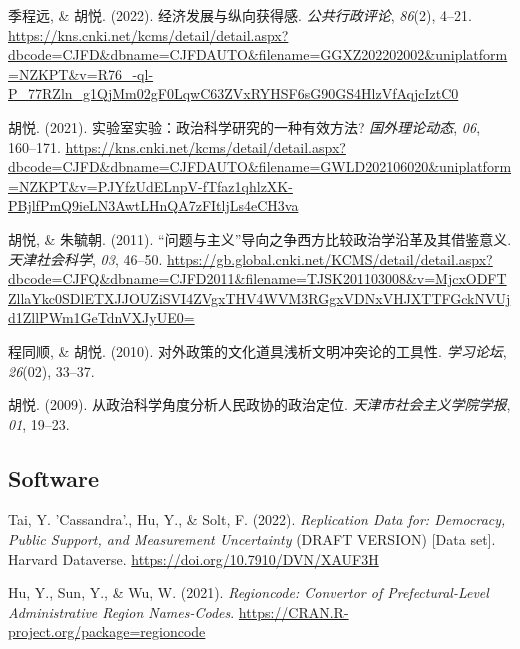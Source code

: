 \documentclass[11pt,a4paper,]{awesome-cv}
\begin{document}
\begingroup
\setlength{\parindent}{-0.5in}
\setlength{\leftskip}{0.5in}

\hypertarget{bibliography}{}
\leavevmode{}%
季程远, \& 胡悦. (2022). 经济发展与纵向获得感. \emph{公共行政评论},
\emph{86}(2), 4--21.
\url{https://kns.cnki.net/kcms/detail/detail.aspx?dbcode=CJFD\&dbname=CJFDAUTO\&filename=GGXZ202202002\&uniplatform=NZKPT\&v=R76_-ql-P_77RZln_g1QjMm02gF0LqwC63ZVxRYHSF6sG90GS4HlzVfAqjcIztC0}

\leavevmode{}%
胡悦. (2021). 实验室实验：政治科学研究的一种有效方法?
\emph{国外理论动态}, \emph{06}, 160--171.
\url{https://kns.cnki.net/kcms/detail/detail.aspx?dbcode=CJFD\&dbname=CJFDAUTO\&filename=GWLD202106020\&uniplatform=NZKPT\&v=PJYfzUdELnpV-fTfaz1qhlzXK-PBjlfPmQ9ieLN3AwtLHnQA7zFItljLs4eCH3va}

\leavevmode{}%
胡悦, \& 朱毓朝. (2011).
{``问题与主义''}导向之争西方比较政治学沿革及其借鉴意义.
\emph{天津社会科学}, \emph{03}, 46--50.
\url{https://gb.global.cnki.net/KCMS/detail/detail.aspx?dbcode=CJFQ\&dbname=CJFD2011\&filename=TJSK201103008\&v=MjcxODFTZllaYkc0SDlETXJJOUZiSVI4ZVgxTHV4WVM3RGgxVDNxVHJXTTFGckNVUjd1ZllPWm1GeTdnVXJyUE0=}

\leavevmode{}%
程同顺, \& 胡悦. (2010). 对外政策的文化道具浅析文明冲突论的工具性.
\emph{学习论坛}, \emph{26}(02), 33--37.

\leavevmode{}%
胡悦. (2009). 从政治科学角度分析人民政协的政治定位.
\emph{天津市社会主义学院学报}, \emph{01}, 19--23.

\endgroup

\hypertarget{software}{%
\subsection{Software}\label{software}}

\begingroup
\setlength{\parindent}{-0.5in}
\setlength{\leftskip}{0.5in}

\hypertarget{bibliography}{}
\leavevmode{}%
Tai, Y. 'Cassandra'., Hu, Y., \& Solt, F. (2022). \emph{Replication Data
for: Democracy, Public Support, and Measurement Uncertainty} (DRAFT
VERSION) {[}Data set{]}. Harvard Dataverse.
\url{https://doi.org/10.7910/DVN/XAUF3H}

\leavevmode{}%
Hu, Y., Sun, Y., \& Wu, W. (2021). \emph{Regioncode: Convertor of
Prefectural-Level Administrative Region Names-Codes}.
\url{https://CRAN.R-project.org/package=regioncode}
\end{document}
